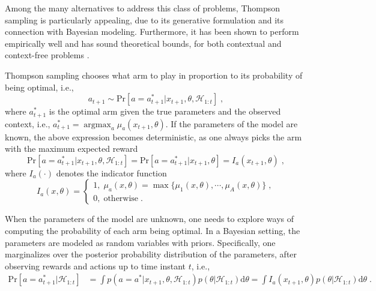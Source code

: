 \documentclass{article}
\newcommand{\ie}{i.e., }
\newcommand{\argmax}{\mathop{\mathrm{argmax}}}
\begin{document}
Among the many alternatives to address this class of problems, Thompson sampling is particularly appealing, due to its generative formulation and its connection with Bayesian modeling. Furthermore, it has been shown to perform empirically well and has sound theoretical bounds, for both contextual and context-free problems \cite{ic-Chapelle2011,j-Agrawal2012,j-Agrawal2012a,ic-Korda2013,j-Russo2014,j-Russo2016}.

Thompson sampling chooses what arm to play in proportion to its probability of being optimal, \ie
\begin{equation}
a_{t+1} \sim \mathrm{Pr}\left[a=a_{t+1}^*|x_{t+1}, \theta, \mathcal{H}_{1:t}\right] \;,
\end{equation} 
where $a_{t+1}^*$ is the optimal arm given the true parameters and the observed context, \ie $a_{t+1}^*=\argmax_{a}\mu_{a}(x_{t+1},\theta)$. If the parameters of the model are known, the above expression becomes deterministic, as one always picks the arm with the maximum expected reward
\begin{equation}
\mathrm{Pr}\left[a=a_{t+1}^*|x_{t+1}, \theta, \mathcal{H}_{1:t} \right] = \mathrm{Pr}\left[a=a_{t+1}^*|x_{t+1}, \theta \right] = I_a(x_{t+1},\theta) \;,
\label{eq:theta_known_pr_arm_optimal}
\end{equation}
where $I_a(\cdot)$ denotes the indicator function
\begin{equation}
I_a(x,\theta) = \begin{cases}
1, \; \mu_{a}(x,\theta)=\max\{\mu_1(x,\theta), \cdots, \mu_A(x,\theta)\} \;, \\
0, \; \text{otherwise} \;.
\end{cases}
\end{equation}

When the parameters of the model are unknown, one needs to explore ways of computing the probability of each arm being optimal. In a Bayesian setting, the parameters are modeled as random variables with priors. Specifically, one marginalizes over the posterior probability distribution of the parameters, after observing rewards and actions up to time instant $t$, \ie
\begin{equation}
\begin{split}
\mathrm{Pr}\left[a=a_{t+1}^* \big| \mathcal{H}_{1:t}\right] & = \int p(a=a^*|x_{t+1}, \theta, \mathcal{H}_{1:t}) p(\theta|\mathcal{H}_{1:t}) \mathrm{d}\theta =\int I_a(x_{t+1}, \theta) p(\theta|\mathcal{H}_{1:t}) \mathrm{d}\theta \; .
\end{split}
\label{eq:theta_unknown_pr_arm_optimal}
\end{equation}
\end{document}
